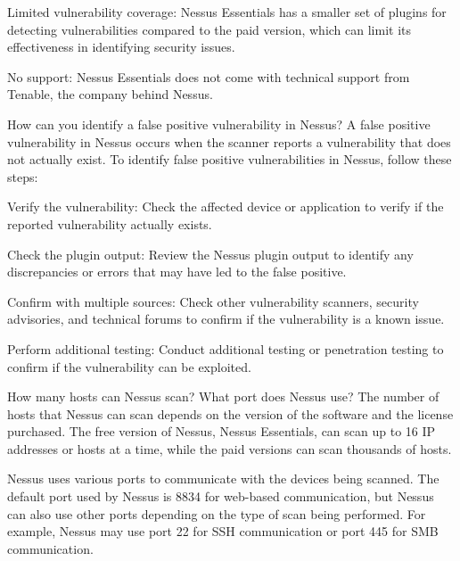 \documentclass[11pt]{article}
\begin{document}
\begin{enumerate}
Limited vulnerability coverage: Nessus Essentials has a smaller set of plugins for detecting vulnerabilities compared to the paid version, which can limit its effectiveness in identifying security issues.

No support: Nessus Essentials does not come with technical support from Tenable, the company behind Nessus.

How can you identify a false positive vulnerability in Nessus?
A false positive vulnerability in Nessus occurs when the scanner reports a vulnerability that does not actually exist. To identify false positive vulnerabilities in Nessus, follow these steps:

Verify the vulnerability: Check the affected device or application to verify if the reported vulnerability actually exists.

Check the plugin output: Review the Nessus plugin output to identify any discrepancies or errors that may have led to the false positive.

Confirm with multiple sources: Check other vulnerability scanners, security advisories, and technical forums to confirm if the vulnerability is a known issue.

Perform additional testing: Conduct additional testing or penetration testing to confirm if the vulnerability can be exploited.

How many hosts can Nessus scan? What port does Nessus use?
The number of hosts that Nessus can scan depends on the version of the software and the license purchased. The free version of Nessus, Nessus Essentials, can scan up to 16 IP addresses or hosts at a time, while the paid versions can scan thousands of hosts.

Nessus uses various ports to communicate with the devices being scanned. The default port used by Nessus is 8834 for web-based communication, but Nessus can also use other ports depending on the type of scan being performed. For example, Nessus may use port 22 for SSH communication or port 445 for SMB communication.
\end{enumerate}
\end{document}
